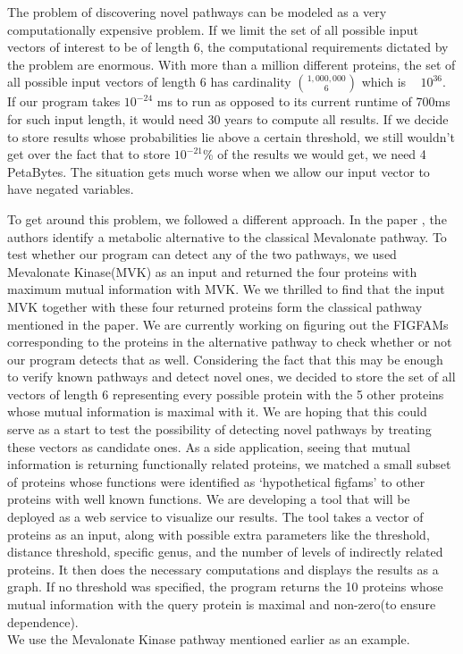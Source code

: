 \documentclass{ucetd}
\begin{document}
The problem of discovering novel pathways can be modeled as a very computationally expensive problem. If we limit the set of all possible input vectors of interest to be of length 6, the computational requirements dictated by the problem are enormous. With more than a million different proteins, the set of all possible input vectors of length 6 has cardinality $\binom{1,000,000} {6}$ which is ~ $10^{36}$. If our program takes $10^{-24}$ ms to run as opposed to its current runtime of 700ms for such input length, it would need 30 years to compute all results. If we decide to store results whose probabilities lie above a certain threshold, we still wouldn't get over the fact that to store $10^{-21}$\% of the results we would get, we need 4 PetaBytes. The situation gets much worse when we allow our input vector to have negated variables.

To get around this problem, we followed a different approach. In the paper \cite{9}, the authors identify a metabolic alternative to the classical Mevalonate pathway. To test whether our program can detect any of the two pathways, we used Mevalonate Kinase(MVK) as an input and returned the four proteins with maximum mutual information with MVK. We we thrilled to find that the input MVK together with these four returned proteins form the classical pathway mentioned in the paper. We are currently working on figuring out the FIGFAMs corresponding to the proteins in the alternative pathway to check whether or not our program detects that as well. 
Considering the fact that this may be enough to verify known pathways and detect novel ones, we decided to store the set of all vectors of length 6 representing every possible protein with the 5 other proteins whose mutual information is maximal with it. We are hoping that this could serve as a start to test the possibility of detecting novel pathways by treating these vectors as candidate ones. 
As a side application, seeing that mutual information is returning functionally related proteins, we matched a small subset of proteins whose functions were identified as `hypothetical figfams' to other proteins with well known functions.
\newpage
We are developing a tool that will be deployed as a web service to visualize our results. The tool takes a vector of proteins as an input, along with possible extra parameters like the threshold, distance threshold, specific genus, and the number of levels of indirectly related proteins. It then does the necessary computations and displays the results as a graph. If no threshold was specified, the program returns the 10 proteins whose mutual information with the query protein is maximal and non-zero(to ensure dependence). \\
We use the Mevalonate Kinase pathway mentioned earlier as an example.
\end{document}
